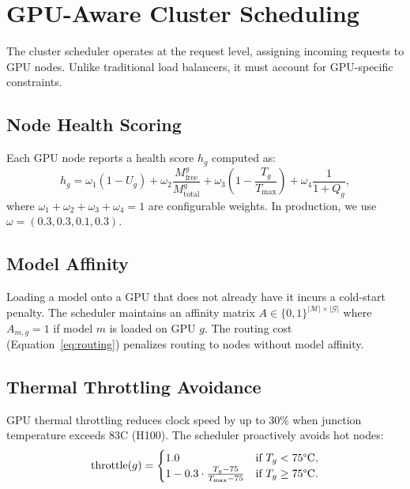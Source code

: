 \section{GPU-Aware Cluster Scheduling}

\label{sec:scheduling}

The cluster scheduler operates at the request level, assigning incoming requests
to GPU nodes. Unlike traditional load balancers, it must account for
GPU-specific constraints.

\subsection{Node Health Scoring}

Each GPU node reports a health score $h_g$ computed as:
\begin{equation}
h_g = \omega_1 (1 - U_g) + \omega_2 \frac{M_{\text{free}}^g}{M_{\text{total}}^g}
+ \omega_3 \left(1 - \frac{T_g}{T_{\max}}\right)
+ \omega_4 \frac{1}{1 + Q_g},
\end{equation}
where $\omega_1 + \omega_2 + \omega_3 + \omega_4 = 1$ are configurable weights.
In production, we use $\omega = (0.3, 0.3, 0.1, 0.3)$.

\subsection{Model Affinity}

Loading a model onto a GPU that does not already have it incurs a cold-start
penalty. The scheduler maintains an affinity matrix $A \in \{0,1\}^{|\mathcal{M}|
\times |\mathcal{G}|}$ where $A_{m,g} = 1$ if model $m$ is loaded on GPU $g$.
The routing cost (Equation~\ref{eq:routing}) penalizes routing to nodes without
model affinity.

\subsection{Thermal Throttling Avoidance}

GPU thermal throttling reduces clock speed by up to 30\% when junction
temperature exceeds 83\textdegree C (H100). The scheduler proactively avoids
hot nodes:
\begin{equation}
\text{throttle}(g) = \begin{cases}
    1.0 & \text{if } T_g < 75\text{\textdegree C}, \\
    1 - 0.3 \cdot \frac{T_g - 75}{T_{\max} - 75} & \text{if } T_g \geq 75\text{\textdegree C}.
\end{cases}
\end{equation}

